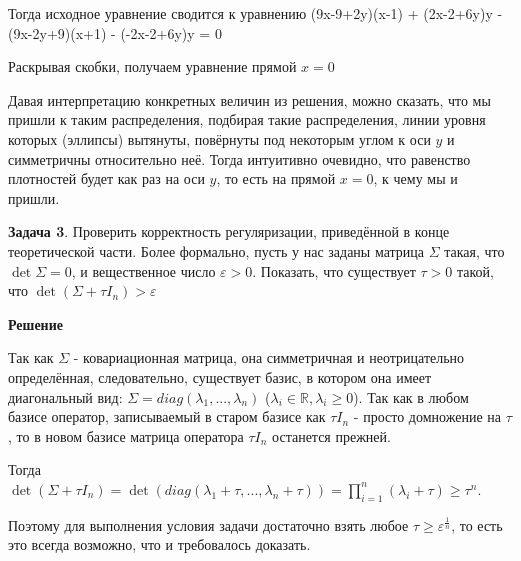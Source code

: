 Тогда исходное уравнение сводится к уравнению \left(9x-9+2y\right)\left(x-1\right) + \left(2x-2+6y\right)y - \left(9x-2y+9\right)\left(x+1\right) - \left(-2x-2+6y\right)y = 0

Раскрывая скобки, получаем уравнение прямой $x = 0$

Давая интерпретацию конкретных величин из решения, можно сказать, что мы пришли к таким распределения, подбирая такие распределения, линии уровня которых (эллипсы) вытянуты, повёрнуты под некоторым углом к оси $y$ и симметричны относительно неё. Тогда интуитивно очевидно, что равенство плотностей будет как раз на оси $y$,  то есть на прямой $x = 0$, к чему мы и пришли.



\textbf{Задача 3}. Проверить корректность регуляризации, приведённой в конце теоретической части. Более формально, пусть у нас заданы матрица $\Sigma$ такая, что $\det \Sigma = 0$, и вещественное число $\varepsilon > 0$. Показать, что существует $\tau > 0$ такой, что $\det(\Sigma + \tau I_{n}) > \varepsilon$

\textbf{Решение}

Так как $\Sigma$ - ковариационная матрица, она симметричная и неотрицательно определённая, следовательно, существует базис, в котором она имеет диагональный вид: $\Sigma = diag (\lambda_1, ..., \lambda_n)$ ($\lambda_i \in \mathbb{R}, \lambda_i \geq 0$). Так как в любом базисе оператор, записываемый в старом базисе как $\tau I_n$ - просто домножение на $\tau$, то в новом базисе матрица оператора $\tau I_n$ останется прежней.

Тогда $\det (\Sigma + \tau I_{n}) = \det(diag(\lambda_1 + \tau, ..., \lambda_n + \tau)) = \prod_{i = 1}^{n}(\lambda_i + \tau) \geq \tau^n$.

Поэтому для выполнения условия задачи достаточно взять любое $\tau \geq \varepsilon^{\frac{1}{n}}$, то есть это всегда возможно, что и требовалось доказать.
